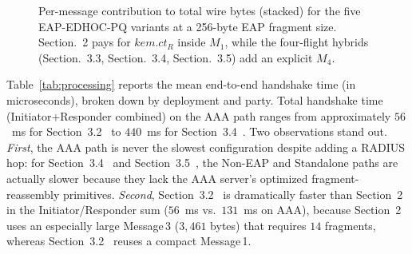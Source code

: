\documentclass{easychair}
\newcommand{\VarSec}[1]{Section~#1~\cite{pq-edhoc-draft}}
\newcommand{\VarSecShort}[1]{Section.~#1}
\begin{document}
\begin{figure}[H]
\centering
{}
\caption{Per-message contribution to total wire bytes (stacked) for the
five EAP-EDHOC-PQ variants at a 256-byte EAP fragment size.
\VarSecShort{2} pays for $\mathit{kem.ct}_R$ inside $M_1$, while
the four-flight hybrids (\VarSecShort{3.3}, \VarSecShort{3.4},
\VarSecShort{3.5}) add an explicit $M_4$.}
\label{fig:wire-stacked}
\end{figure}
\FloatBarrier
Table~\ref{tab:processing} reports the mean end-to-end handshake time
(in microseconds), broken down by deployment and party. Total
handshake time (Initiator+Responder combined) on the AAA path ranges
from approximately $56$~ms for \VarSec{3.2} to $440$~ms for
\VarSec{3.4}. Two observations stand out. \emph{First}, the AAA path is
never the slowest configuration despite adding a RADIUS hop: for
\VarSec{3.4} and \VarSec{3.5}, the Non-EAP and Standalone paths are
actually slower because they lack the AAA server's optimized
fragment-reassembly primitives. \emph{Second}, \VarSec{3.2} is
dramatically faster than \VarSec{2} in the Initiator/Responder sum
($56$~ms vs.\ $131$~ms on AAA), because \VarSec{2} uses an especially
large Message\,3 ($3{,}461$ bytes) that requires $14$ fragments,
whereas \VarSec{3.2} reuses a compact Message\,1.
\end{document}
